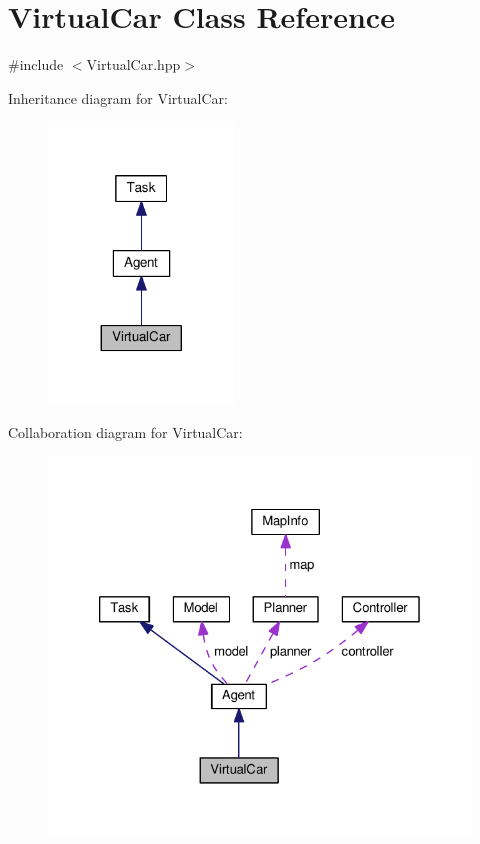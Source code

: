 \hypertarget{classVirtualCar}{}\section{Virtual\+Car Class Reference}
\label{classVirtualCar}


{\ttfamily \#include $<$Virtual\+Car.\+hpp$>$}



Inheritance diagram for Virtual\+Car\+:\nopagebreak
\begin{figure}[H]
\begin{center}
\leavevmode
\includegraphics[width=140pt]{classVirtualCar__inherit__graph}
\end{center}
\end{figure}


Collaboration diagram for Virtual\+Car\+:\nopagebreak
\begin{figure}[H]
\begin{center}
\leavevmode
\includegraphics[width=326pt]{classVirtualCar__coll__graph}
\end{center}
\end{figure}
